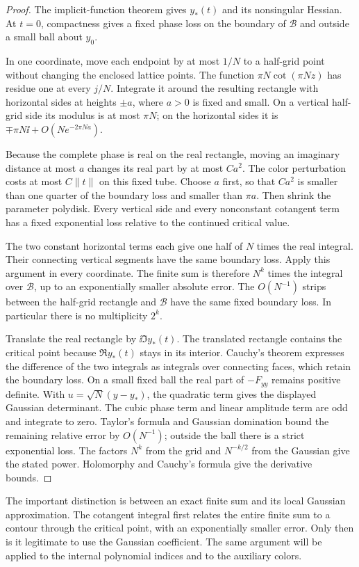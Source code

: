 \begin{proof}
The implicit-function theorem gives $y_*(t)$ and its nonsingular
Hessian. At $t=0$, compactness gives a fixed phase loss on the
boundary of $\mathcal B$ and outside a small ball about $y_0$.

In one coordinate, move each endpoint by at most $1/N$ to a
half-grid point without changing the enclosed lattice points.
The function $\pi N\cot(\pi Nz)$ has residue one at every
$j/N$. Integrate it around the resulting rectangle with horizontal
sides at heights $\pm a$, where $a>0$ is fixed and small.
On a vertical half-grid side its modulus is at most $\pi N$;
on the horizontal sides it is
$\mp\pi N\ii+O(Ne^{-2\pi Na})$.

Because the complete phase is real on the real rectangle, moving
an imaginary distance at most $a$ changes its real part by at most
$Ca^2$. The color perturbation costs at most $C\|t\|$ on this
fixed tube. Choose $a$ first, so that $Ca^2$ is smaller than one
quarter of the boundary loss and smaller than $\pi a$. Then shrink
the parameter polydisk. Every vertical side and every nonconstant
cotangent term has a fixed exponential loss relative to the
continued critical value.

The two constant horizontal terms each give one half of $N$ times
the real integral. Their connecting vertical segments have the
same boundary loss. Apply this argument in every coordinate.
The finite sum is therefore $N^k$ times the integral over
$\mathcal B$, up to an exponentially smaller absolute error.
The $O(N^{-1})$ strips between the half-grid rectangle and
$\mathcal B$ have the same fixed boundary loss. In particular there
is no multiplicity $2^k$.

Translate the real rectangle by $\ii\Im y_*(t)$. The translated
rectangle contains the critical point because $\Re y_*(t)$ stays
in its interior. Cauchy's theorem expresses the difference of the two
integrals as integrals over connecting faces, which retain the boundary
loss. On a small fixed ball the real part of $-F_{yy}$ remains positive
definite.
With $u=\sqrt N(y-y_*)$, the quadratic term gives the displayed
Gaussian determinant. The cubic phase term and linear amplitude
term are odd and integrate to zero. Taylor's formula and Gaussian
domination bound the remaining relative error by $O(N^{-1})$;
outside the ball there is a strict exponential loss. The factors
$N^k$ from the grid and $N^{-k/2}$ from the Gaussian give the
stated power. Holomorphy and Cauchy's formula give the derivative
bounds.
\end{proof}

The important distinction is between an exact finite sum and its local
Gaussian approximation. The cotangent integral first relates the
entire finite sum to a contour through the critical point, with an
exponentially smaller error. Only then is it legitimate to use the
Gaussian coefficient. The same argument will be applied to the
internal polynomial indices and to the auxiliary colors.
